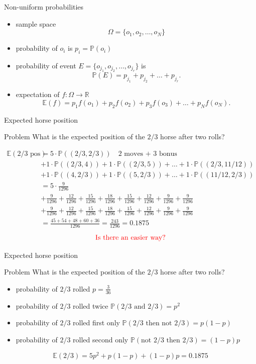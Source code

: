 \documentclass{beamer}
\begin{document}
\begin{frame}{Non-uniform probabilities}
\begin{itemize}
\pause
\item sample space
$$\Omega = \{o_1,o_2,\dots, o_N\}$$
\pause
\item probability of $o_i$ is $p_i=\mathbb P(o_i)$
\pause
\item probability of event $E = \{o_{j_1},o_{j_2},\dots, o_{j_r}\}$ is
$$\mathbb P(E) = p_{j_1} + p_{j_2} + \dots + p_{j_r}.$$
\pause
\item expectation of $f: \Omega\rightarrow\mathbb R$
$$\mathbb E(f) = p_1 f(o_1) + p_2 f(o_2) + p_3 f(o_3) + \dots + p_N f(o_N).$$
\end{itemize}
\end{frame}

\begin{frame}{Expected horse position}
  \begin{block}{Problem}
    What is the expected position of the $2/3$ horse after two rolls?
  \end{block}
\pause
{\tiny
  \begin{align*}
    \mathbb{E}(\text{2/3 pos})
    & = 5\cdot \mathbb P((2/3,2/3))\quad \text{2 moves + 3 bonus}\\
    & + 1\cdot \mathbb P((2/3,4)) + 1\cdot\mathbb P((2/3,5)) + \dots + 1\cdot\mathbb P((2/3,11/12))\\
    & + 1\cdot \mathbb P((4,2/3)) + 1\cdot\mathbb P((5,2/3)) + \dots + 1\cdot\mathbb P((11/12,2/3))\\
    & = 5\cdot \frac{9}{1296}\\
    & + \frac{9}{1296} + \frac{12}{1296} + \frac{15}{1296} + \frac{18}{1296} +  \frac{15}{1296} +  \frac{12}{1296} + \frac{9}{1296} + \frac{9}{1296} \\
    & + \frac{9}{1296} + \frac{12}{1296} + \frac{15}{1296} + \frac{18}{1296} +  \frac{15}{1296} +  \frac{12}{1296} + \frac{9}{1296} + \frac{9}{1296} \\
    & = \frac{45 + 54 + 48 + 60 + 36}{1296} = \frac{243}{1296} = 0.1875
  \end{align*}
}
$$\text{{\color{red}Is there an easier way?}}$$
\end{frame}

\begin{frame}{Expected horse position}
  \begin{block}{Problem}
    What is the expected position of the $2/3$ horse after two rolls?
  \end{block}
\pause
\begin{itemize}
\pause
\item probability of $2/3$ rolled $p=\frac{3}{36}$
\pause
\item probability of $2/3$ rolled twice $\mathbb P(\text{2/3 and 2/3}) = p^2$
\pause
\item probability of $2/3$ rolled first only $\mathbb P(\text{2/3 then not 2/3}) = p(1-p)$
\pause
\item probability of $2/3$ rolled second only $\mathbb P(\text{not 2/3 then 2/3}) = (1-p)p$
\end{itemize}
\pause
$$\mathbb E(2/3) = 5p^2 + p(1-p) + (1-p)p = 0.1875$$
\end{frame}
\end{document}
